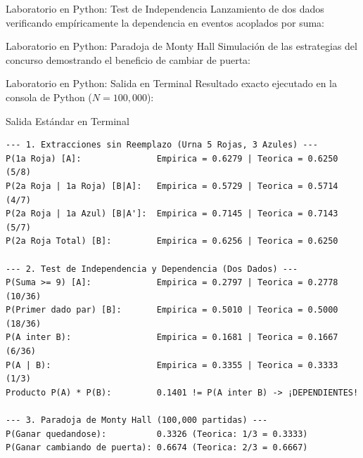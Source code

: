 \documentclass[10pt,aspectratio=169]{beamer}
\begin{document}
\begin{frame}[fragile]{Laboratorio en Python: Test de Independencia}
  Lanzamiento de dos dados verificando empíricamente la dependencia en eventos acoplados por suma:
  \vspace{0.2em}
  {
  }
\end{frame}

\begin{frame}[fragile]{Laboratorio en Python: Paradoja de Monty Hall}
  Simulación de las estrategias del concurso demostrando el beneficio de cambiar de puerta:
  \vspace{0.2em}
  {
  }
\end{frame}

\begin{frame}[fragile]{Laboratorio en Python: Salida en Terminal}
  Resultado exacto ejecutado en la consola de Python ($N = 100,000$):
  \vspace{0.2em}
  \begin{block}{Salida Estándar en Terminal}
    \fontsize{6.0pt}{7.0pt}\selectfont
    \begin{verbatim}
--- 1. Extracciones sin Reemplazo (Urna 5 Rojas, 3 Azules) ---
P(1a Roja) [A]:               Empirica = 0.6279 | Teorica = 0.6250 (5/8)
P(2a Roja | 1a Roja) [B|A]:   Empirica = 0.5729 | Teorica = 0.5714 (4/7)
P(2a Roja | 1a Azul) [B|A']:  Empirica = 0.7145 | Teorica = 0.7143 (5/7)
P(2a Roja Total) [B]:         Empirica = 0.6256 | Teorica = 0.6250

--- 2. Test de Independencia y Dependencia (Dos Dados) ---
P(Suma >= 9) [A]:             Empirica = 0.2797 | Teorica = 0.2778 (10/36)
P(Primer dado par) [B]:       Empirica = 0.5010 | Teorica = 0.5000 (18/36)
P(A inter B):                 Empirica = 0.1681 | Teorica = 0.1667 (6/36)
P(A | B):                     Empirica = 0.3355 | Teorica = 0.3333 (1/3)
Producto P(A) * P(B):         0.1401 != P(A inter B) -> ¡DEPENDIENTES!

--- 3. Paradoja de Monty Hall (100,000 partidas) ---
P(Ganar quedandose):          0.3326 (Teorica: 1/3 = 0.3333)
P(Ganar cambiando de puerta): 0.6674 (Teorica: 2/3 = 0.6667)
    \end{verbatim}
  \end{block}
\end{frame}
\end{document}
